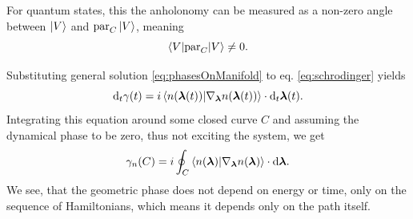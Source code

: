 For quantum states, this the anholonomy can be measured as a non-zero angle between $\ket{V}$ and $\textrm{par}_C\ket{V}$, meaning
$$\braket{V|\textrm{par}_C|V}\neq 0.$$ 


Substituting general solution \ref{eq:phasesOnManifold} to eq. \ref{eq:schrodinger} yields
\begin{equation}
    \mathrm{d}_t \gamma(t)=i\braket{n({\bm\lambda}(t))|\nabla_{\bm\lambda} n({\bm\lambda}(t))}\cdot \mathrm{d}_t {\bm\lambda}(t).
\end{equation}
Integrating this equation around some closed curve $C$ and assuming the dynamical phase to be zero, thus not exciting the system, we get
\begin{equation}
    \gamma_n(C)=i\oint_C\braket{n({\bm\lambda})|\nabla_{\bm\lambda} n({\bm\lambda})}\cdot \mathrm{d} {\bm\lambda}.
    \label{eq:gammaCoint}
\end{equation}
We see, that the geometric phase does not depend on energy or time, only on the sequence of Hamiltonians, which means it depends only on the path itself.




